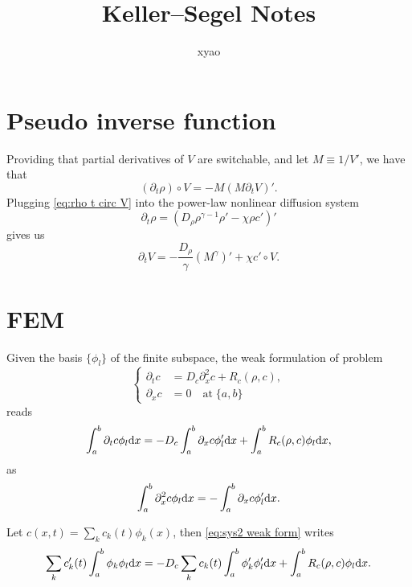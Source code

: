 \documentclass{article}
\title{Keller--Segel Notes}
\author{xyao}
\begin{document}
  \maketitle
  \section{Pseudo inverse function}
  Providing that partial derivatives of $V$ are switchable, and let $M\equiv 1 / V'$, we have that
  \begin{equation}
    \label{eq:rho t circ V}
    (\partial_t\rho)\circ V = -M(M\partial_t V)'.
  \end{equation}
  Plugging \cref{eq:rho t circ V} into the power-law nonlinear diffusion system
  \[
    \partial_t \rho = \left(D_{\rho}\rho^{\gamma - 1}\rho' - \chi\rho c'\right)'
  \]
  gives us
  \[
    \partial_t V = -\frac{D_\rho}{\gamma}(M^\gamma)' + \chi c'\circ V.
  \]

  \section{FEM}
  Given the basis $\{\phi_l\}$ of the finite subspace, the weak formulation of problem
  \[
    \left\{
      \begin{aligned}
        \partial_t c &= D_c \partial_x^2 c + R_c(\rho, c), \\
        \partial_x c &= 0\quad\text{at}\;\{a,b\}
      \end{aligned}
    \right.
  \]
  reads
  \begin{equation}
    \label{eq:sys2 weak form}
    \int_a^b \partial_t c \phi_l\mathrm d x = - D_c\int_a^b \partial_x c\phi_l'\mathrm d x
                                          + \int_a^b R_c(\rho, c)\phi_l\mathrm d x,
  \end{equation}
  as
  \[
    \int_a^b \partial^2_x c\phi_l \mathrm d x = - \int_a^b \partial_x c\phi_l'\mathrm d x.
  \]

  Let $c(x, t) = \sum_k c_k(t)\phi_k(x)$, then \cref{eq:sys2 weak form} writes
  \[
    \sum_k c'_k(t)\int_a^b\phi_k\phi_l\mathrm d x = - D_c\sum_k c_k(t)\int_a^b\phi_k'\phi_l'\mathrm d x
                                                + \int_a^b R_c(\rho, c)\phi_l\mathrm d x.
  \]
\end{document}
